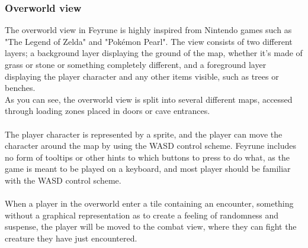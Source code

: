 \subsubsection{Overworld view}
The overworld view in Feyrune is highly inspired from Nintendo games such as "The Legend of Zelda" and "Pokémon Pearl". The view consists of two different layers; a background layer displaying the ground of the map, whether it's made of grass or stone or something completely different, and a foreground layer displaying the player character and any other items visible, such as trees or benches.\\
{\noindent %
As you can see, the overworld view is split into several different maps, accessed through loading zones placed in doors or cave entrances.}\\
\\
The player character is represented by a sprite, and the player can move the character around the map by using the WASD control scheme. Feyrune includes no form of tooltips or other hints to which buttons to press to do what, as the game is meant to be played on a keyboard, and most player should be familiar with the WASD control scheme.\\
\\
When a player in the overworld enter a tile containing an encounter, something without a graphical representation as to create a feeling of randomness and suspense, the player will be moved to the combat view, where they can fight the creature they have just encountered.\\